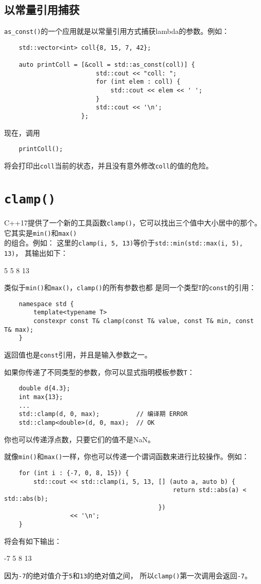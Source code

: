 \subsection{以常量引用捕获}\label{ch25.2.1}
\texttt{as\_const()}的一个应用就是以常量引用方式捕获lambda的参数。例如：
\begin{lstlisting}
    std::vector<int> coll{8, 15, 7, 42};

    auto printColl = [&coll = std::as_const(coll)] {
                         std::cout << "coll: ";
                         for (int elem : coll) {
                             std::cout << elem << ' ';
                         }
                         std::cout << '\n';
                     };
\end{lstlisting}
现在，调用
\begin{lstlisting}
    printColl();
\end{lstlisting}
将会打印出\texttt{coll}当前的状态，并且没有意外修改\texttt{coll}的值的危险。


\section{\texttt{clamp()}}
C++17提供了一个新的工具函数\texttt{clamp()}，它可以找出三个值中大小居中的那个。
它其实是\texttt{min()}和\texttt{max()}\\
的组合。例如：
这里的\texttt{clamp(i, 5, 13)}等价于\texttt{std::min(std::max(i, 5), 13)}，
其输出如下：
\begin{blacklisting}
    5
    5
    8
    13
\end{blacklisting}
类似于\texttt{min()}和\texttt{max()}，\texttt{clamp()}的所有参数也都
是同一个类型\texttt{T}的\texttt{const}的引用：
\begin{lstlisting}
    namespace std {
        template<typename T>
        constexpr const T& clamp(const T& value, const T& min, const T& max);
    }
\end{lstlisting}
返回值也是\texttt{const}引用，并且是输入参数之一。

如果你传递了不同类型的参数，你可以显式指明模板参数\texttt{T}：
\begin{lstlisting}
    double d{4.3};
    int max{13};
    ...
    std::clamp(d, 0, max);          // 编译期 ERROR
    std::clamp<double>(d, 0, max);  // OK
\end{lstlisting}
你也可以传递浮点数，只要它们的值不是NaN。

就像\texttt{min()}和\texttt{max()}一样，你也可以传递一个谓词函数来进行比较操作。例如：
\begin{lstlisting}
    for (int i : {-7, 0, 8, 15}) {
        std::cout << std::clamp(i, 5, 13, [] (auto a, auto b) {
                                              return std::abs(a) < std::abs(b);
                                          })
                  << '\n';
    }
\end{lstlisting}
将会有如下输出：
\begin{blacklisting}
    -7
    5
    8
    13
\end{blacklisting}
因为\texttt{-7}的绝对值介于\texttt{5}和\texttt{13}的绝对值之间，
所以\texttt{clamp()}第一次调用会返回\texttt{-7}。

